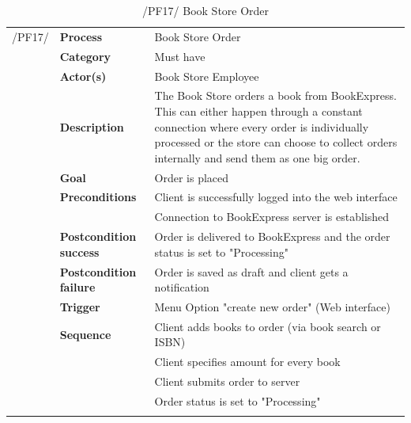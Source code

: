 \documentclass[11pt,a4paper,oneside,svgnames]{report}
\begin{document}
\begin{table}[H]
\centering
\begin{tabular}{p{1.5cm}p{3cm}p{8cm}}
\cellcolor{white}/PF17/	& \textbf{Process} & Book Store Order\\ 
\cellcolor{white}		& \textbf{Category} & Must have\\
\cellcolor{white}		& \textbf{Actor(s)} & Book Store Employee\\ 
\cellcolor{white}		& \textbf{Description}	 & The Book Store orders a book from BookExpress.
This can either happen through a constant connection where every order is individually processed or the store can choose to collect orders internally and send them
as one big order.\\ 
\cellcolor{white}		& \textbf{Goal} & Order is placed\\
\cellcolor{white}		& \textbf{Preconditions} & Client is successfully logged into the web interface\\
\cellcolor{white}		& & Connection to BookExpress server is established\\
\cellcolor{white}		& \textbf{Postcondition success} & Order is delivered to BookExpress  and the order status is set to "Processing"\\
\cellcolor{white}		& \textbf{Postcondition failure} & Order is saved as draft and client gets a notification\\
\cellcolor{white}		& \textbf{Trigger} & Menu Option "create new order" (Web interface)\\
\cellcolor{white}		& \textbf{Sequence} & Client adds books to order (via book search or ISBN)\\
\cellcolor{white}		& & Client specifies amount for every book\\
\cellcolor{white}		& & Client submits order to server\\
\cellcolor{white}		& & Order status is set to "Processing"\\
\cellcolor{white}\hfill \\
\end{tabular}
\caption{/PF17/ Book Store Order}
\label{tab:pf17}
\end{table}
\end{document}

